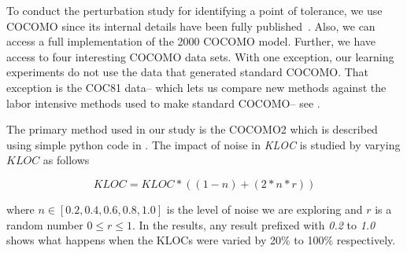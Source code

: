 To conduct the perturbation study for identifying a point of tolerance,  we use  COCOMO since its internal details have been fully published~\cite{boehm00b}. Also, we can access a full implementation of the  2000 COCOMO model. Further, we have access to four interesting  COCOMO data sets. With one exception, our learning experiments do not use the data that generated   standard COCOMO. That exception is the  COC81 data-- which  lets us  compare new methods against the  labor intensive methods used to make standard COCOMO-- see .

The primary method used in our study is the COCOMO2 which is described using simple python code in . The impact of noise in \textit{KLOC} is studied by varying $\mathit{KLOC}$ as follows

\begin{equation}
    \label{eq:kloc}
    \mathit{KLOC} = \mathit{KLOC}*((1- n) + (2*n*r))
\end{equation}

where $n \in [0.2, 0.4, 0.6, 0.8, 1.0]$ is the level of noise we are exploring and $r$ is a random number
$0 \le r \le 1$. In the results, any result
prefixed with {\em 0.2} to {\em 1.0} shows what happens
when the KLOCs were varied by 20\% to 100\% respectively.

